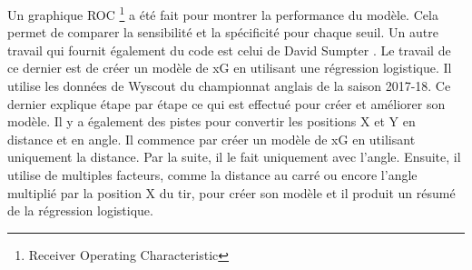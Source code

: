 \documentclass[12pt]{article}
\begin{document}
Un graphique ROC \footnote{Receiver Operating Characteristic} a été fait pour montrer la performance du modèle. Cela permet de comparer la sensibilité et la spécificité pour chaque seuil.
\newline\newline
Un autre travail qui fournit également du code est celui de David Sumpter \cite{sumpterFittingXGModel}. 
Le travail de ce dernier est de créer un modèle de xG en utilisant une régression logistique. 
Il utilise les données de Wyscout du championnat anglais de la saison 2017-18. 
Ce dernier explique étape par étape ce qui est effectué pour créer et améliorer son modèle.
Il y a également des pistes pour convertir les positions X et Y en distance et en angle.
Il commence par créer un modèle de xG en utilisant uniquement la distance. 
Par la suite, il le fait uniquement avec l'angle.
Ensuite, il utilise de multiples facteurs, comme la distance au carré ou encore l'angle multiplié par la position X du tir, pour créer son modèle et il produit un résumé de la régression logistique.
\end{document}
